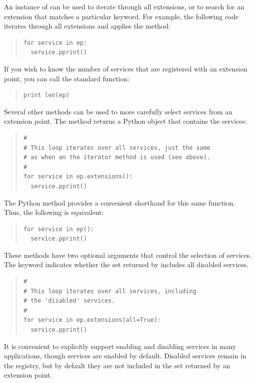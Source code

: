 An instance of  can be used to iterate through
all extensions, or to search for an extension that matches a particular
keyword. For example, the following code iterates through all extensions
and applies the  method:
\begin{quotation}
\begin{lstlisting}
for service in ep:
  service.pprint()
\end{lstlisting}
\end{quotation}
If you wish to know the number of services that are registered with an
extension point, you can call the standard  function:
\begin{quotation}
\begin{lstlisting}
print len(ep)
\end{lstlisting}
\end{quotation}

Several other methods can be used to more carefully select services from
an extension point. The  method returns a Python  object
that contains the services:
\begin{quotation}
\begin{lstlisting}
#
# This loop iterates over all services, just the same
# as when an the iterator method is used (see above).
#
for service in ep.extensions():
  service.pprint()
\end{lstlisting}
\end{quotation}
The Python  method provides a convenient shorthand for this same function.  Thus, the following is equivalent:
\begin{quotation}
\begin{lstlisting}
for service in ep():
  service.pprint()
\end{lstlisting}
\end{quotation}

These methods have two optional arguments that control the selection of services.  The  
keyword indicates whether
the set returned by  includes all disabled services. 
\begin{quotation}
\begin{lstlisting}
#
# This loop iterates over all services, including
# the 'disabled' services.
#
for service in ep.extensions(all=True):
  service.pprint()
\end{lstlisting}
\end{quotation}
It is
convenient to explicitly support enabling and disabling services in many
applications, though services are enabled by default. Disabled services
remain in the registry, but by default they are not included in the set
returned by an extension point.

